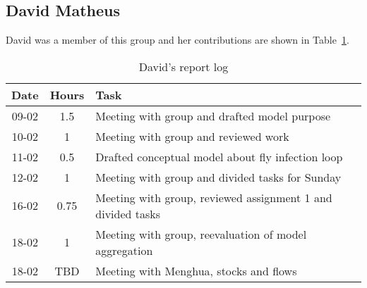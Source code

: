 \subsection{David Matheus}
David was a member of this group and her contributions are shown in Table~\ref{tab:david_log}. 
\begin{longtable}[c]{c|c|m{35em}}
\caption{David's report log}
\label{tab:david_log}\\
\textbf{Date}& \textbf{Hours} & \textbf{Task} \\
\hline
\endfirsthead
%
\endhead
%
09-02   &   1.5     &   Meeting with group and drafted model purpose                    \\
10-02   &   1       &   Meeting with group and reviewed work                            \\
11-02   &   0.5     &   Drafted conceptual model about fly infection loop               \\
12-02   &   1       &   Meeting with group and divided tasks for Sunday                 \\
16-02   &   0.75    &   Meeting with group, reviewed assignment 1 and divided tasks     \\
18-02   &   1       &   Meeting with group, reevaluation of model aggregation           \\
18-02   &   TBD     &   Meeting with Menghua, stocks and flows                          \\
\end{longtable}